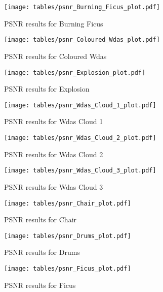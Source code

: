 \begin{figure}[h!]
\centering
\texttt{[image: tables/psnr\_Burning\_Ficus\_plot.pdf]}
\caption{PSNR results for Burning Ficus}
\label{fig:ap_psnr_Burning Ficus_plot}
\end{figure}

\begin{figure}[h!]
\centering
\texttt{[image: tables/psnr\_Coloured\_Wdas\_plot.pdf]}
\caption{PSNR results for Coloured Wdas}
\label{fig:ap_psnr_Coloured Wdas_plot}
\end{figure}

\begin{figure}[h!]
\centering
\texttt{[image: tables/psnr\_Explosion\_plot.pdf]}
\caption{PSNR results for Explosion}
\label{fig:ap_psnr_Explosion_plot}
\end{figure}

\begin{figure}[h!]
\centering
\texttt{[image: tables/psnr\_Wdas\_Cloud\_1\_plot.pdf]}
\caption{PSNR results for Wdas Cloud 1}
\label{fig:ap_psnr_Wdas Cloud 1_plot}
\end{figure}

\begin{figure}[h!]
\centering
\texttt{[image: tables/psnr\_Wdas\_Cloud\_2\_plot.pdf]}
\caption{PSNR results for Wdas Cloud 2}
\label{fig:ap_psnr_Wdas Cloud 2_plot}
\end{figure}

\begin{figure}[h!]
\centering
\texttt{[image: tables/psnr\_Wdas\_Cloud\_3\_plot.pdf]}
\caption{PSNR results for Wdas Cloud 3}
\label{fig:ap_psnr_Wdas Cloud 3_plot}
\end{figure}

\begin{figure}[h!]
\centering
\texttt{[image: tables/psnr\_Chair\_plot.pdf]}
\caption{PSNR results for Chair}
\label{fig:ap_psnr_Chair_plot}
\end{figure}

\begin{figure}[h!]
\centering
\texttt{[image: tables/psnr\_Drums\_plot.pdf]}
\caption{PSNR results for Drums}
\label{fig:ap_psnr_Drums_plot}
\end{figure}

\begin{figure}[h!]
\centering
\texttt{[image: tables/psnr\_Ficus\_plot.pdf]}
\caption{PSNR results for Ficus}
\label{fig:ap_psnr_Ficus_plot}
\end{figure}

